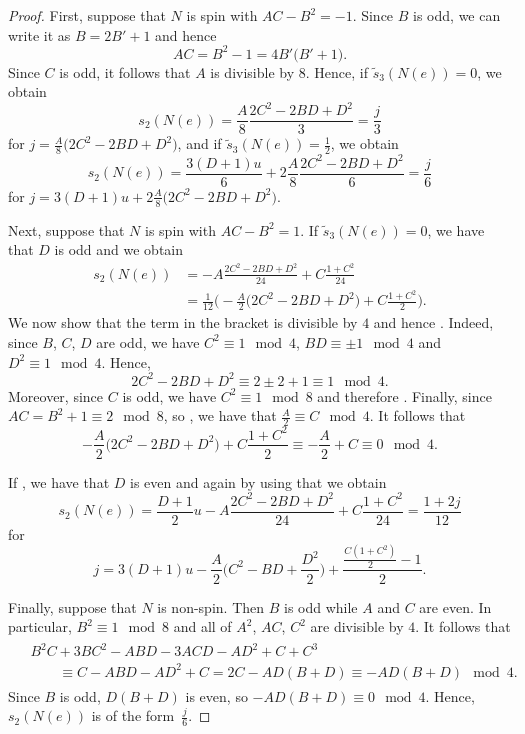 \documentclass[10pt,a4paper]{amsart}
\numberwithin{equation}{section}
\theoremstyle{definition}
\numberwithin{table}{section}
\begin{document}
\begin{proof}
	First, suppose that $N$ is spin with $AC-B^2=-1$. Since $B$ is odd, we can write it as $B=2B'+1$ and hence
	\[ AC=B^2-1=4B'\bigl(B'+1\bigr). \]
	Since $C$ is odd, it follows that $A$ is divisible by $8$. Hence, if $\tilde{s}_3(N(e))=0$, we obtain
	\[ s_2(N(e))=\frac{A}{8}\frac{2C^2-2BD+D^2}{3}=\frac{j}{3} \]
	for $j=\frac{A}{8}\bigl(2C^2-2BD+D^2\bigr)$, and if $\tilde{s}_3(N(e))=\frac{1}{2}$, we obtain
	\[ s_2(N(e))=\frac{3(D+1)u}{6}+2\frac{A}{8}\frac{2C^2-2BD+D^2}{6}=\frac{j}{6} \]
	for $j=3(D+1)u+2\frac{A}{8}\bigl(2C^2-2BD+D^2\bigr)$.
	
	Next, suppose that $N$ is spin with $AC-B^2=1$. If $\tilde{s}_3(N(e))=0$, we have that $D$ is odd and we obtain
	\begin{align*}
    s_2(N(e))&=-A\frac{2C^2-2BD+D^2}{24}+C\frac{1+C^2}{24}\\
    &=\frac{1}{12}\biggl( -\frac{A}{2}\bigl(2C^2-2BD+D^2\bigr)+C\frac{1+C^2}{2} \biggr).
    \end{align*}
	We now show that the term in the bracket is divisible by $4$ and hence . Indeed, since $B$, $C$, $D$ are odd, we have $C^2\equiv 1\mod 4$, $BD\equiv\pm 1\mod 4$ and $D^2\equiv 1\mod 4$. Hence,
	\[ 2C^2-2BD+D^2\equiv 2\pm 2+1\equiv 1\mod 4. \]
	Moreover, since $C$ is odd, we have $C^2\equiv 1\mod 8$ and therefore . Finally, since $AC=B^2+1\equiv 2\mod 8$, so , we have that $\frac{A}{2}\equiv C\mod 4$. It follows that
	\[-\frac{A}{2}\bigl(2C^2-2BD+D^2\bigr)+C\frac{1+C^2}{2}\equiv -\frac{A}{2}+C\equiv 0\mod 4.  \]
	
	If , we have that $D$ is even and again by using that  we obtain
	\[ s_2(N(e))=\frac{D+1}{2}u-A\frac{2C^2-2BD+D^2}{24}+C\frac{1+C^2}{24}=\frac{1+2j}{12} \]
	for
	\[j=3(D+1)u-\frac{A}{2}\biggl(C^2-BD+\frac{D^2}{2}\biggr)+\frac{\frac{C(1+C^2)}{2}-1}{2}.\]
	
	Finally, suppose that $N$ is non-spin. Then $B$ is odd while $A$ and $C$ are even. In particular, $B^2\equiv 1\mod 8$ and all of $A^2$, $AC$, $C^2$ are divisible by $4$. It follows that
	\begin{align*}
\begin{split}
		&B^2C+3BC^2-ABD-3ACD-AD^2+C+C^3\\
& \qquad \equiv C-ABD-AD^2+C
		 =2C-AD(B+D)
		 \equiv -AD(B+D)\mod 4.
\end{split}
	\end{align*}
	Since $B$ is odd, $D(B+D)$ is even, so $-AD(B+D)\equiv 0\mod 4$. Hence, $s_2(N(e))$ is of the form~$\frac{j}{6}$.
	

\end{proof}
\end{document}
